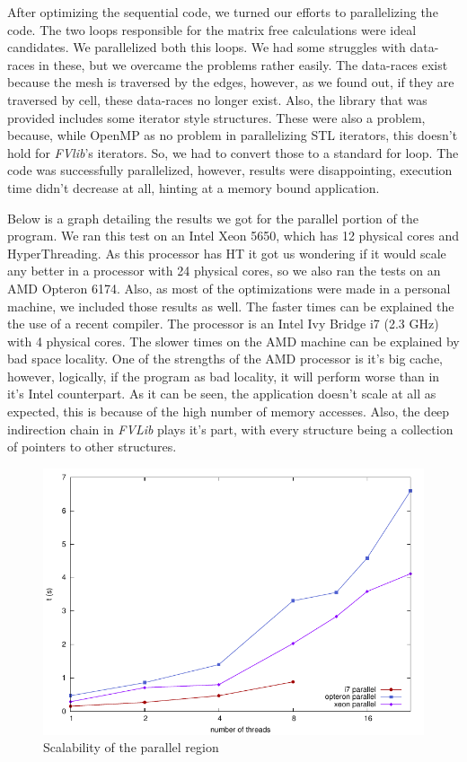 \documentclass[a4paper,10pt,openright,openbib,twocolumn]{article}
\begin{document}
After optimizing the sequential code, we turned our efforts to parallelizing the code. The two loops responsible for the matrix free calculations were ideal candidates. We parallelized both this loops. We had some struggles with data-races in these, but we overcame the problems rather easily. The data-races exist because the mesh is traversed by the edges, however, as we found out, if they are traversed by cell, these data-races no longer exist. Also, the library that was provided includes some iterator style structures. These were also a problem, because, while OpenMP as no problem in parallelizing STL iterators, this doesn't hold for \emph{FVlib}'s iterators. So, we had to convert those to a standard for loop. The code was successfully parallelized, however, results were disappointing, execution time didn't decrease at all, hinting at a memory bound application.

Below is a graph detailing the results we got for the parallel portion of the program. We ran this test on an Intel Xeon 5650, which has 12 physical cores and HyperThreading. As this processor has HT it got us wondering if it would scale any better in a processor with 24 physical cores, so we also ran the tests on an AMD Opteron 6174. Also, as most of the optimizations were made in a personal machine, we included those results as well. The faster times can be explained the the use of a recent compiler. The processor is an Intel Ivy Bridge i7 (2.3 GHz) with 4 physical cores. The slower times on the AMD machine can be explained by bad space locality. One of the strengths of the AMD processor is it's big cache, however, logically, if the program as bad locality, it will perform worse than in it's Intel counterpart. 
As it can be seen, the application doesn't scale at all as expected, this is because of the high number of memory accesses. Also, the deep indirection chain in \emph{FVLib} plays it's part, with every structure being a collection of pointers to other structures.

\begin{figure}[H]
    \centering
    \begin{minipage}[t]{\columnwidth}
        \includegraphics[width=\textwidth]{../../../openmp/results/parallel.pdf}
        \caption{Scalability of the parallel region \label{fig:parallel}}
    \end{minipage}
\end{figure}
\end{document}
